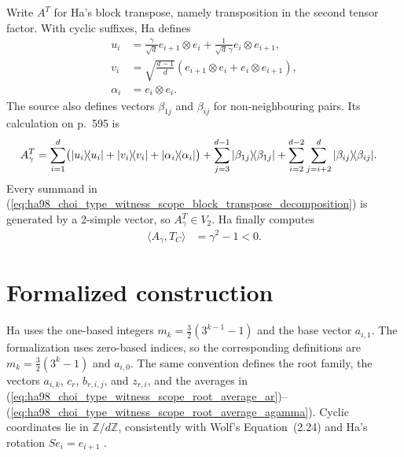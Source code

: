 \documentclass{article}
\begin{document}
Write $A^T$ for Ha's block transpose, namely transposition in the second tensor
factor. With cyclic suffixes, Ha defines
\begin{align}
    u_i
        &=\frac{\gamma}{\sqrt d}e_{i+1}\otimes e_i
          +\frac{1}{\sqrt d\,\gamma}e_i\otimes e_{i+1},
    \label{eq:ha98_choi_type_witness_scope_ui}\\
    v_i
        &=\sqrt{\frac{d-1}{d}}
          (e_{i+1}\otimes e_i+e_i\otimes e_{i+1}),
    \label{eq:ha98_choi_type_witness_scope_vi}\\
    \alpha_i
        &=e_i\otimes e_i.
    \label{eq:ha98_choi_type_witness_scope_alpha_i}
\end{align}
The source also defines vectors $\beta_{1j}$ and $\beta_{ij}$ for
non-neighbouring pairs. Its calculation on p.~595 is
\begin{align}
    A_\gamma^T
        &=\sum_{i=1}^{d}
          \bigl(          |u_i\rangle\!\langle u_i|
              +|v_i\rangle\!\langle v_i|
              +|\alpha_i\rangle\!\langle \alpha_i|
          \bigr)
          +\sum_{j=3}^{d-1}|\beta_{1j}\rangle\!\langle \beta_{1j}|
          +\sum_{i=2}^{d-2}\sum_{j=i+2}^{d}
            |\beta_{ij}\rangle\!\langle \beta_{ij}|.
    \label{eq:ha98_choi_type_witness_scope_block_transpose_decomposition}
\end{align}
Every summand in
(\ref{eq:ha98_choi_type_witness_scope_block_transpose_decomposition}) is
generated by a 2-simple vector, so $A_\gamma^T\in V_2$. Ha finally computes
\begin{align}
    \langle A_\gamma,T_C\rangle
        &=\gamma^2-1
        <0.
    \label{eq:ha98_choi_type_witness_scope_negative_pairing}
\end{align}

\section{Formalized construction}

Ha uses the one-based integers
$m_k=\frac{3}{2}(3^{k-1}-1)$ and the base vector $a_{i,1}$. The formalization
uses zero-based indices, so the corresponding definitions are
$m_k=\frac{3}{2}(3^k-1)$ and $a_{i,0}$. The same convention defines the root
family, the vectors $a_{i,k}$, $c_r$, $b_{r,i,j}$, and $z_{r,i}$, and the
averages in
(\ref{eq:ha98_choi_type_witness_scope_root_average_ar})--%
(\ref{eq:ha98_choi_type_witness_scope_root_average_agamma}). Cyclic
coordinates lie in $\mathbb Z/d\mathbb Z$, consistently with Wolf's
Equation~(2.24) \cite{Wolf2012Quantum} and Ha's rotation
$Se_i=e_{i+1}$ \cite{Ha1998AtomicPositiveMaps}.
\end{document}
